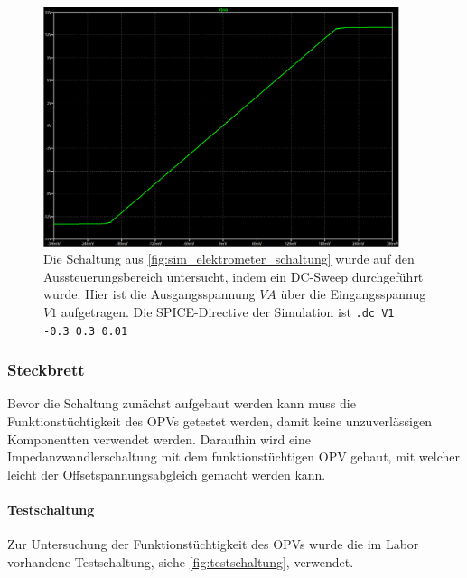 \documentclass[12pt,english,ngerman]{scrartcl}
\begin{document}
\begin{figure}[H]
  \centering
    \includegraphics[width=\linewidth, height=7cm]{./figures/elektrometer/sim/aus_sweep.png}
  \caption{Die Schaltung aus \autoref{fig:sim_elektrometer_schaltung} wurde auf
    den Aussteuerungsbereich untersucht, indem ein DC-Sweep durchgeführt wurde.
    Hier ist die Ausgangsspannung $VA$ über die Eingangsspannug $V1$
    aufgetragen. Die SPICE-Directive der Simulation ist \texttt{.dc V1 -0.3 0.3 0.01}}
  \label{fig:sim_elektrometer_dcsweep}
\end{figure}

\subsubsection{Steckbrett} \label{sec:elektrometer_steckbrett}
Bevor die Schaltung zunächst aufgebaut werden kann muss die
Funktionstüchtigkeit des OPVs getestet werden, damit keine unzuverlässigen
Komponentten verwendet werden. Daraufhin wird eine Impedanzwandlerschaltung mit
dem funktionstüchtigen OPV gebaut, mit welcher leicht der
Offsetspannungsabgleich gemacht werden kann.


\paragraph{Testschaltung}
Zur Untersuchung der Funktionstüchtigkeit des OPVs wurde die im Labor vorhandene
Testschaltung, siehe \autoref{fig:testschaltung}, verwendet. 
\end{document}
